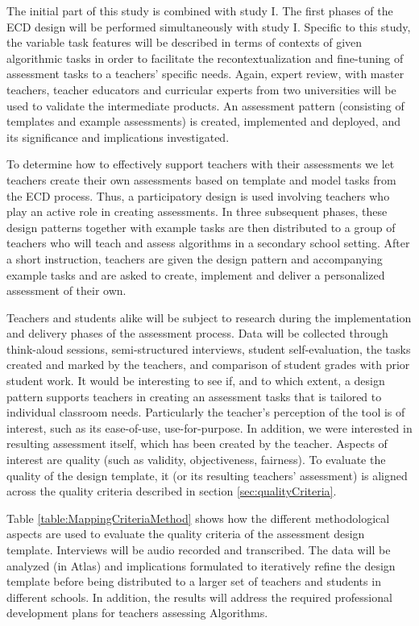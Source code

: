 The initial part of this study is combined with study I. The first phases of the ECD design will be performed simultaneously with study I.  Specific to this study, the variable task features will be described in terms of contexts of given algorithmic tasks in order to facilitate the recontextualization and fine-tuning of assessment tasks to a teachers' specific needs. Again, expert review, with master teachers, teacher educators and curricular experts from two universities will be used to validate the intermediate products. An assessment pattern (consisting of templates and example assessments) is created, implemented and deployed, and its significance and implications investigated.


To determine how to effectively support teachers with their assessments we let teachers create their own assessments based on template and model tasks from the ECD process. Thus, a participatory design is used involving teachers who play an active role in creating assessments. In three subsequent phases, these design patterns together with example tasks are then distributed to a group of teachers who will teach and assess algorithms in a secondary school setting. After a short instruction, teachers are given the design pattern and accompanying example tasks and are asked to create, implement and deliver a personalized assessment of their own.


Teachers and students alike will be subject to research during the implementation and delivery phases of the assessment process. Data will be collected through think-aloud sessions, semi-structured interviews, student self-evaluation, the tasks created and marked by the teachers, and comparison of student grades with prior student work. It would be interesting to see if, and to which extent, a design pattern supports teachers in creating an assessment tasks that is tailored to individual classroom needs. Particularly the teacher's perception of the tool is of interest, such as its ease-of-use, use-for-purpose. In addition, we were interested in resulting assessment itself, which has been created by the teacher. Aspects of interest are quality (such as validity, objectiveness, fairness). To evaluate the quality of the design template, it (or its resulting teachers' assessment) is aligned across the quality criteria described in section \ref{sec:qualityCriteria}.




Table \ref{table:MappingCriteriaMethod} shows how the different methodological aspects are used to evaluate the quality criteria of the assessment design template. Interviews will be audio recorded and transcribed. The data will be analyzed (in Atlas) and implications formulated to iteratively refine the design template before being distributed to a larger set of teachers and students in different schools.  In addition, the results will address the required professional development plans for teachers assessing Algorithms.


